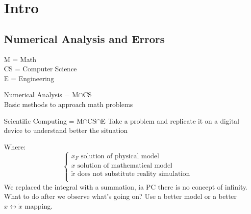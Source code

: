 
\section{Intro}
\subsection{Numerical Analysis and Errors}
M = Math\\
CS = Computer Science\\
E = Engineering

Numerical Analysis = M$\cap$CS\\
Basic methods to approach math problems

Scientific Computing = M$\cap$CS$\cap$E
Take a problem and replicate it on a digital device to understand better the situation

\begin{figure}[!ht]
    \begin{minipage}{\linewidth}
        \centering
    \end{minipage}
\end{figure}
Where:
$$
\begin{cases}
    x_F\text{ solution of physical model}\\
    x\text{ solution of mathematical model}\\
    \tilde{x}\text{ does not substitute reality simulation}\\
\end{cases}
$$
We replaced the integral with a summation, ia PC there is no concept of infinity.\\
What to do after we observe what's going on? Use a better model or a better $x\leftrightarrow\tilde{x}$ mapping.

